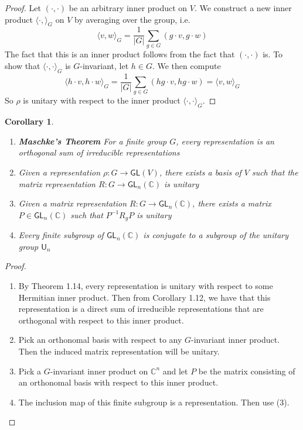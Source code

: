 \documentclass[psamsfonts]{amsart}
\newtheorem{cor}[thm]{Corollary}
\theoremstyle{definition}
\theoremstyle{remark}
\newcommand{\C}{\mathbb{C}}
\newcommand{\GL}{\mathsf{GL}}
\newcommand{\inv}{^{-1}}
\newcommand{\abs}[1]{\left\lvert#1\right\rvert}
\begin{document}
\begin{proof}
Let $(\cdot, \cdot)$ be an arbitrary inner product on $V$. We construct a new inner product $\langle \cdot, \rangle_G$ on $V$ by averaging over the group, i.e.
$$\langle v, w \rangle_G = \frac{1}{\abs{G}} \sum_{g \in G} (g\cdot v, g\cdot w) $$
The fact that this is an inner product follows from the fact that $(\cdot, \cdot)$ is. To show that $\langle \cdot,\cdot \rangle_G$ is $G$-invariant, let $h \in G$. We then compute
$$\langle h\cdot v, h\cdot w \rangle_G = \frac{1}{\abs{G}}\sum_{g\in G} (hg\cdot v, hg\cdot w) = \langle v,w\rangle_G $$
So $\rho$ is unitary with respect to the inner product $\langle \cdot, \cdot \rangle_G$.
\end{proof}

\begin{cor}\ \\ \vspace{-\baselineskip}
\begin{enumerate}
\item \textbf{Maschke's Theorem} For a finite group $G$, every representation is an orthogonal sum of irreducible representations
\item Given a representation $\rho: G \to \GL(V)$, there exists a basis of $V$ such that the matrix representation $R: G \to \GL_n(\C)$ is unitary
\item Given a matrix representation $R: G \to \GL_n(\C)$, there exists a matrix $P \in \GL_n(\C)$ such that $P\inv R_g P$ is unitary
\item Every finite subgroup of $\GL_n(\C)$ is conjugate to a subgroup of the unitary group $\mathsf{U}_n$
\end{enumerate}
\end{cor}

\begin{proof}\ \\ \vspace{-\baselineskip}
\begin{enumerate}
\item By Theorem 1.14, every representation is unitary with respect to some Hermitian inner product. Then from Corollary 1.12, we have that this representation is a direct sum of irreducible representations that are orthogonal with respect to this inner product.
\item Pick an orthonomal basis with respect to any $G$-invariant inner product. Then the induced matrix representation will be unitary.
\item Pick a $G$-invariant inner product on $\C^n$ and let $P$ be the matrix consisting of an orthonomal basis with respect to this inner product. 
\item The inclusion map of this finite subgroup is a representation. Then use (3).
\end{enumerate}
\end{proof}
\end{document}
